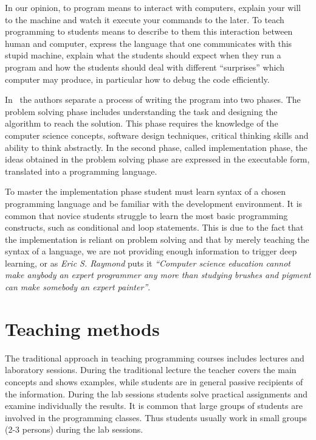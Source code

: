 \documentclass{article}
\begin{document}
In our opinion, to program means to interact with computers, explain your will
to the machine and watch it execute your commands to the later. To teach
programming to students means to describe to them this interaction between human
and computer, express the language that one communicates with this stupid
machine, explain what the students should expect when they run a program and how
the students should deal with different ``surprises'' which computer may
produce, in particular how to debug the code efficiently.

In~\cite{state_of_art} the authors separate a process of writing the program
into two phases. The problem solving phase includes understanding the task
and designing the algorithm to reach the solution. This phase requires the
knowledge of the computer science concepts, software design techniques, critical
thinking skills and ability to think abstractly. In the second phase, called
implementation phase, the ideas obtained in the problem solving phase are
expressed in the executable form, translated into a programming language.

To master the implementation phase student must learn syntax of a chosen
programming language and be familiar with the development environment. It is
common that novice students struggle to learn the most basic programming
constructs, such as conditional and loop statements. This is due to the fact
that the implementation is reliant on problem solving and that by merely
teaching the syntax of a language, we are not providing enough information to
trigger deep learning, or as \emph{Eric S. Raymond} puts it 
\emph{``Computer science education cannot make anybody an expert programmer any
more than studying brushes and pigment can make somebody an expert painter''}. 

\section{Teaching methods}

The traditional approach in teaching programming courses includes lectures and
laboratory sessions. During the traditional lecture the teacher covers the
main concepts and shows examples, while students are in general passive
recipients of the information. During the lab sessions students solve practical
assignments and examine individually the results. It is common that large groups
of students are involved in the programming classes. Thus students usually work
in small groups (2-3 persons) during the lab sessions. 
\end{document}
